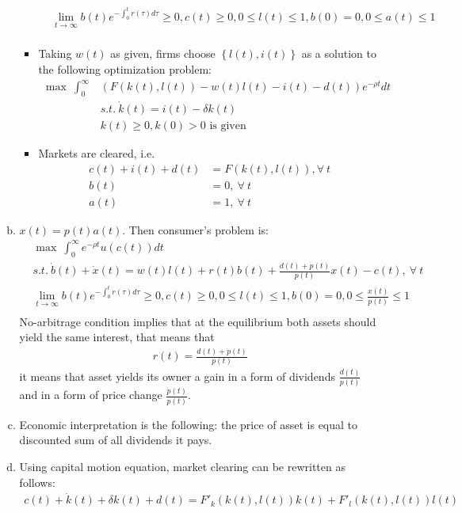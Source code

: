 \documentclass[a4paper]{article}
\begin{document}
\begin{enumerate}[1.]
\begin{enumerate}[(a)]
\begin{itemize}
\begin{align*}
			&\lim_{t \to \infty} b(t)e^{-\int_{0}^t r(\tau)d\tau} \ge 0, c(t) \ge 0, 0 \le l(t) \le 1, b(0) = 0, 0 \le a(t) \le 1\\
			\end{align*}
			\item Taking $w(t)$ as given, firms choose $\left\{l(t), i(t)\right\}$ as a solution to the following optimization problem:
			\begin{align*}
			\max\ \int_{0}^{\infty} &(F(k(t), l(t)) - w(t)l(t) - i(t) - d(t))e^{-\rho t}dt\\
			&s.t.\ \dot{k}(t) = i(t) - \delta k(t)\\
			&k(t) \ge 0, k(0) > 0 \text{ is given}
			\end{align*}
			\item Markets are cleared, i.e.
			\begin{align*}
			c(t) + i(t) + d(t)&= F(k(t), l(t)), \forall\ t\\
			b(t) &= 0,\ \forall\ t\\
			a(t) &= 1,\ \forall\ t
			\end{align*}
		\end{itemize}
	\item $x(t) = p(t)a(t)$. Then consumer's problem is:
	\begin{align*}
	&\max\ \int_{0}^{\infty} e^{-\rho t}u(c(t))dt\\
	&s.t.\ \dot{b}(t) + \dot{x}(t) = w(t)l(t) + r(t)b(t) + \frac{d(t) + \dot{p}(t)}{p(t)}x(t) - c(t),\ \forall\ t\\
	&\lim_{t \to \infty} b(t)e^{-\int_{0}^t r(\tau)d\tau} \ge 0, c(t) \ge 0, 0 \le l(t) \le 1, b(0) = 0,0 \le \frac{x(t)}{p(t)} \le 1\\
	\end{align*}
	No-arbitrage condition implies that at the equilibrium both assets should yield the same interest, that means that
	\begin{align*}
	r(t) = \frac{d(t) + \dot{p}(t)}{p(t)}
	\end{align*}
	it means that asset yields its owner a gain in a form of dividends $\frac{d(t)}{p(t)}$ and in a form of price change $\frac{\dot{p}(t)}{p(t)}$.
	\item Economic interpretation is the following: the price of asset is equal to discounted sum of all dividends it pays.
	\item Using capital motion equation, market clearing can be rewritten as follows:
	\begin{align*}
	c(t) + \dot{k}(t) + \delta k(t) + d(t) = F'_k(k(t), l(t))k(t) + F'_l(k(t), l(t))l(t)\\

\end{align*}
\end{enumerate}
\end{enumerate}
\end{document}
